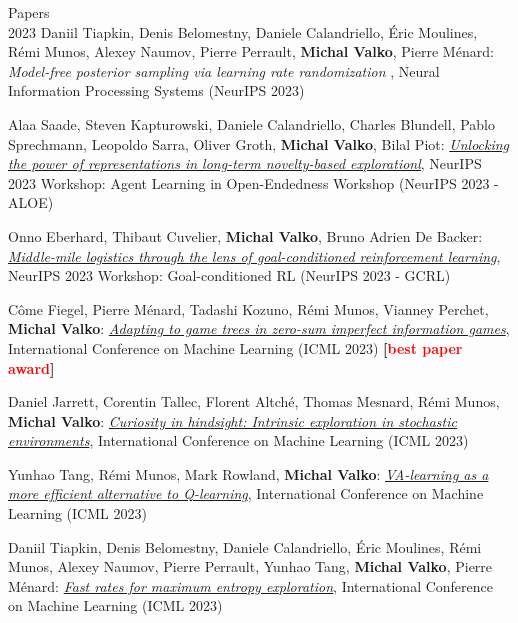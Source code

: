 \documentclass{resume}
\begin{document}
\begin{category}{Papers\\2023}
\citembullet
Daniil Tiapkin, Denis Belomestny, Daniele Calandriello, \' Eric Moulines, R\' emi Munos, Alexey Naumov,  Pierre Perrault, {\bf Michal Valko}, Pierre M\' enard: 
\emph{Model-free posterior sampling via learning rate randomization}%
,
Neural Information Processing Systems
({\sf NeurIPS 2023}) 

\citembullet
Alaa Saade, Steven Kapturowski, Daniele Calandriello, Charles Blundell, Pablo Sprechmann, Leopoldo Sarra, Oliver Groth,  {\bf Michal Valko}, Bilal Piot:
\href{https://arxiv.org/pdf/2305.01521.pdf}{\emph{Unlocking the power of representations in long-term novelty-based explorationl}},
NeurIPS 2023 Workshop: Agent Learning in Open-Endedness Workshop
({\sf NeurIPS 2023 - ALOE}) 


\citembullet
Onno Eberhard, Thibaut Cuvelier, {\bf Michal Valko}, Bruno Adrien De Backer:
\href{https://openreview.net/pdf?id=l8iK6YqgkR}{\emph{Middle-mile logistics through the lens of goal-conditioned reinforcement learning}},
NeurIPS 2023 Workshop: Goal-conditioned RL
({\sf NeurIPS 2023 - GCRL}) 


\citembullet
C\^ome Fiegel, Pierre M\' enard, Tadashi Kozuno, R\' emi Munos, Vianney Perchet,  {\bf Michal Valko}:
\href{https://arxiv.org/pdf/2212.12567}{\emph{Adapting to game trees in zero-sum imperfect information games}},
International Conference on Machine Learning
({\sf ICML 2023}) 
{\bf [\textcolor{red}{best paper award}]}


\citembullet
Daniel Jarrett, Corentin Tallec, Florent Altch\'e, Thomas Mesnard, R\'emi Munos, {\bf Michal Valko}:
\href{https://arxiv.org/pdf/2206.08332.pdf}
{\emph{Curiosity in hindsight: Intrinsic exploration in stochastic environments}},
International Conference on Machine Learning
({\sf ICML 2023}) 

\citembullet
Yunhao Tang, R\' emi Munos, Mark Rowland,  {\bf Michal Valko}: 
\href{https://arxiv.org/pdf/2305.18161.pdf}
{\emph{VA-learning as a more efficient alternative to Q-learning}}, 
International Conference on Machine Learning
({\sf ICML 2023}) 

\citembullet
Daniil Tiapkin, Denis Belomestny, Daniele Calandriello, \' Eric Moulines, R\' emi Munos, Alexey Naumov,  Pierre Perrault, Yunhao Tang, {\bf Michal Valko}, Pierre M\' enard: 
\href{https://arxiv.org/abs/2303.08059.pdf} 
{\emph{Fast rates for maximum entropy exploration}},
International Conference on Machine Learning
({\sf ICML 2023}) 




\end{category}
\end{document}
